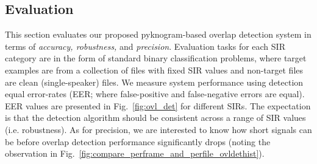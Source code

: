 {\subsection{Evaluation}
\label{ssec:exp_pykno}

This section evaluates our proposed pyknogram-based overlap detection system in terms of {\it accuracy, robustness,} and {\it precision}. 
Evaluation tasks for each SIR category are in the form of standard binary classification problems, where target examples are from a collection of files with fixed SIR values and non-target files are clean (single-speaker) files. 
We measure system performance using detection equal error-rates (EER; where false-positive and false-negative errors are equal). 
EER values are presented in Fig.~\ref{fig:ovl_det} for different SIRs. 
The expectation is that the detection algorithm should be consistent across a range of SIR values (i.e. robustness). 
As for precision, we are interested to know how short signals can be before overlap detection performance significantly drops (noting the observation in Fig.~\ref{fig:compare_perframe_and_perfile_ovldethist}). 


\vspace{3mm}
}
